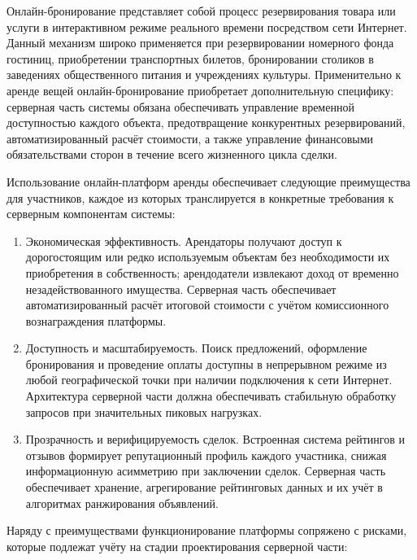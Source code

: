 Онлайн-бронирование представляет собой процесс резервирования товара или услуги в интерактивном режиме реального времени посредством сети Интернет. Данный механизм широко применяется при резервировании номерного фонда гостиниц, приобретении транспортных билетов, бронировании столиков в заведениях общественного питания и учреждениях культуры. Применительно к аренде вещей онлайн-бронирование приобретает дополнительную специфику: серверная часть системы обязана обеспечивать управление временной доступностью каждого объекта, предотвращение конкурентных резервирований, автоматизированный расчёт стоимости, а также управление финансовыми обязательствами сторон в течение всего жизненного цикла сделки.
 
Использование онлайн-платформ аренды обеспечивает следующие преимущества для участников, каждое из которых транслируется в конкретные требования к серверным компонентам системы:
 
\begin{enumerate}
    \item Экономическая эффективность. Арендаторы получают доступ к дорогостоящим или редко используемым объектам без необходимости их приобретения в собственность; арендодатели извлекают доход от временно незадействованного имущества. Серверная часть обеспечивает автоматизированный расчёт итоговой стоимости с учётом комиссионного вознаграждения платформы.
    \item Доступность и масштабируемость. Поиск предложений, оформление бронирования и проведение оплаты доступны в непрерывном режиме из любой географической точки при наличии подключения к сети Интернет. Архитектура серверной части должна обеспечивать стабильную обработку запросов при значительных пиковых нагрузках.
    \item Прозрачность и верифицируемость сделок. Встроенная система рейтингов и отзывов формирует репутационный профиль каждого участника, снижая информационную асимметрию при заключении сделок. Серверная часть обеспечивает хранение, агрегирование рейтинговых данных и их учёт в алгоритмах ранжирования объявлений.
\end{enumerate}
 
Наряду с преимуществами функционирование платформы сопряжено с рисками, которые подлежат учёту на стадии проектирования серверной части:
 
